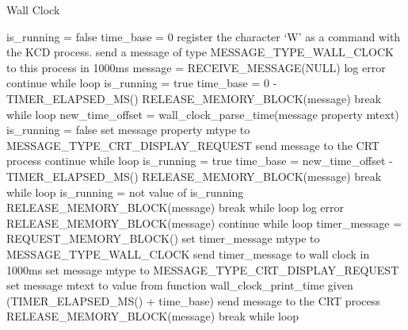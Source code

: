 \documentclass[12pt]{report}
\begin{document}
\begin{algorithm}
  \caption{Wall Clock}
  \begin{algorithmic}[1]
      \State is\_running = false
      \State time\_base = 0
      \State register the character ‘W’ as a command with the KCD process.
      \State send a message of type MESSAGE\_TYPE\_WALL\_CLOCK to this process in 1000ms
        \State message = RECEIVE\_MESSAGE(NULL)
          \State log error
          \State continue while loop
        \EndIf
          \State is\_running = true
          \State time\_base = 0 - TIMER\_ELAPSED\_MS()
          \State RELEASE\_MEMORY\_BLOCK(message)
          \State break while loop
          \State new\_time\_offset = wall\_clock\_parse\_time(message property mtext)
            \State is\_running = false
            \State set message property mtype to MESSAGE\_TYPE\_CRT\_DISPLAY\_REQUEST
            \State send message to the CRT process
            \State continue while loop
          \EndIf
          \State is\_running = true
          \State time\_base = new\_time\_offset - TIMER\_ELAPSED\_MS()
          \State RELEASE\_MEMORY\_BLOCK(message)
          \State break while loop
          \State is\_running = not value of is\_running
                \State RELEASE\_MEMORY\_BLOCK(message)
                \State break while loop
        \Else
            \State log error
            \State RELEASE\_MEMORY\_BLOCK(message)
            \State continue while loop
          \EndIf
          \State timer\_message = REQUEST\_MEMORY\_BLOCK()
          \State set timer\_message mtype to MESSAGE\_TYPE\_WALL\_CLOCK
    send timer\_message to wall clock in 1000ms
            \State set message mtype to MESSAGE\_TYPE\_CRT\_DISPLAY\_REQUEST
            \State set message mtext to value from function wall\_clock\_print\_time given (TIMER\_ELAPSED\_MS() + time\_base)
            \State send message to the CRT process
          \Else
            \State RELEASE\_MEMORY\_BLOCK(message)
          \EndIf
          \State break while loop
        \EndIf
      \EndWhile
    \EndFunction
  \end{algorithmic}
\end{algorithm}
\end{document}
